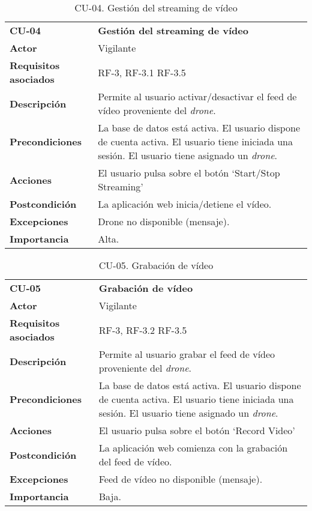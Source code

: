 \begin{table}[H]
	\begin{center}
		\begin{tabular}{m{3cm} | m{10cm}}\hline
			\toprule
			\textbf{CU-04} & \textbf{Gestión del streaming de vídeo}\\
			\otoprule
			\textbf{Actor} & Vigilante\\
			\textbf{Requisitos asociados} & RF-3, RF-3.1 RF-3.5\\
			\textbf{Descripción} & Permite al usuario activar/desactivar el feed de vídeo proveniente del \emph{drone}.\\
			\textbf{Precondiciones} & La base de datos está activa. El usuario dispone de cuenta activa. El usuario tiene iniciada una sesión. El usuario tiene asignado un \emph{drone}.\\
			\textbf{Acciones} & \item El usuario pulsa sobre el botón `Start/Stop Streaming'\\
			
			\textbf{Postcondición} & La aplicación web inicia/detiene el vídeo.\\
			\textbf{Excepciones} &  Drone no disponible (mensaje).\\
			\textbf{Importancia} & Alta.\\
			\hline
			\bottomrule
		\end{tabular}
		\caption{CU-04. Gestión del streaming de vídeo}
		\label{tb:CU04}
	\end{center}
\end{table}


\begin{table}[H]
	\begin{center}
		\begin{tabular}{m{3cm} | m{10cm}}\hline
			\toprule
			\textbf{CU-05} & \textbf{Grabación de vídeo}\\
			\otoprule
			\textbf{Actor} & Vigilante\\
			\textbf{Requisitos asociados} & RF-3, RF-3.2 RF-3.5\\
			\textbf{Descripción} & Permite al usuario grabar el feed de vídeo proveniente del \emph{drone}.\\
			\textbf{Precondiciones} & La base de datos está activa. El usuario dispone de cuenta activa. El usuario tiene iniciada una sesión. El usuario tiene asignado un \emph{drone}.\\
			\textbf{Acciones} & \item El usuario pulsa sobre el botón `Record Video'\\
			
			\textbf{Postcondición} & La aplicación web comienza con la grabación del feed de vídeo.\\
			\textbf{Excepciones} &\item Feed de vídeo no disponible (mensaje).\\
			\textbf{Importancia} & Baja.\\
			\hline
			\bottomrule
		\end{tabular}
		\caption{CU-05. Grabación de vídeo}
		\label{tb:CU05}
	\end{center}
\end{table}

